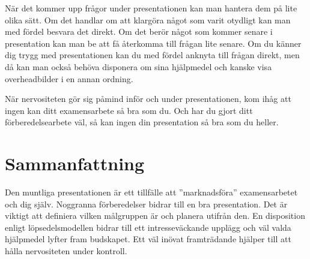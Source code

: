 När det kommer upp frågor under presentationen kan man hantera dem på
lite olika sätt. Om det handlar om att klargöra något som varit otydligt
kan man med fördel besvara det direkt. Om det berör något som kommer
senare i presentation kan man be att få återkomma till frågan lite
senare. Om du känner dig trygg med presentationen kan du med fördel
anknyta till frågan direkt, men då kan man också behöva disponera om
sina hjälpmedel och kanske visa overheadbilder i en annan ordning.

När nervositeten gör sig påmind inför och under presentationen, kom ihåg
att ingen kan ditt examensarbete så bra som du. Och har du gjort ditt
förberedelsearbete väl, så kan ingen din presentation så bra som du
heller.

\section{Sammanfattning}\label{sammanfattning}

Den muntliga presentationen är ett tillfälle att ''marknadsföra''
examensarbetet och dig själv. Noggranna förberedelser bidrar till en bra
presentation. Det är viktigt att definiera vilken målgruppen är och
planera utifrån den. En disposition enligt löpsedelsmodellen bidrar till
ett intresseväckande upplägg och väl valda hjälpmedel lyfter fram
budskapet. Ett väl inövat framträdande hjälper till att hålla
nervositeten under kontroll.
